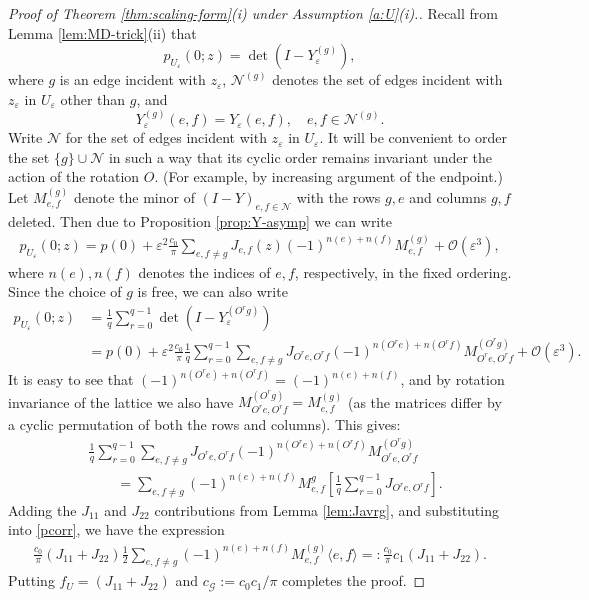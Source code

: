 \documentclass[11pt]{article}
\theoremstyle{remark}
\def\eps{\varepsilon}
\def\cG{\mathcal{G}}
\def\cN{\mathcal{N}}
\newcommand{\eqnspl}[2]{\begin{equation}\begin{split}\label{#1}%
   #2\end{split}\end{equation}}
\newcommand{\eqnsplst}[1]{\begin{equation*}\begin{split}%
   #1\end{split}\end{equation*}}
\begin{document}
\begin{proof}[Proof of Theorem \ref{thm:scaling-form}(i) under Assumption \ref{a:U}(i).]
Recall from Lemma \ref{lem:MD-trick}(ii) that
\[ p_{U_\eps}(0;z)
   = \det(I - Y^{(g)}_{\eps}), \]
where $g$ is an edge incident with $z_\eps$, $\cN^{(g)}$ denotes the set of edges incident with $z_\eps$
in $U_\eps$ other than $g$, and 
\[ Y^{(g)}_\eps(e,f)
   = Y_\eps(e,f), \quad e, f \in \cN^{(g)}. \]
Write $\cN$ for the set of edges incident with $z_\eps$ in $U_\eps$. It will be convenient
to order the set $\{ g \} \cup \mathcal{N}$ in such a way that its cyclic order remains
invariant under the action of the rotation $O$. (For example, by increasing argument of the
endpoint.) Let $M^{(g)}_{e,f}$ denote the minor of $(I - Y)_{e, f \in \cN}$ with 
the rows $g,e$ and columns $g,f$ deleted. Then due to Proposition \ref{prop:Y-asymp} we can write
\eqnsplst{
 p_{U_\eps}(0;z)
 = p(0) + \eps^2 \frac{c_0}{\pi} \sum_{e,f \not= g} 
   J_{e,f}(z) (-1)^{n(e)+n(f)} M^{(g)}_{e,f} + \mathcal{O}(\eps^3), }
where $n(e), n(f)$ denotes the indices of $e, f$, respectively, in the fixed ordering.
Since the choice of $g$ is free, we can also write
\begin{equation*}  
\begin{split}
 p_{U_\eps}(0;z)
 &= \frac{1}{q} \sum_{r=0}^{q-1} \det(I - Y^{(O^r g)}_{\eps}) \\
 &= p(0) + \eps^2 \frac{c_0}{\pi} \frac{1}{q} \sum_{r=0}^{q-1} \sum_{e,f \not= g} 
   J_{O^r e, O^r f} (-1)^{n(O^r e) + n(O^r f)} M^{(O^r g)}_{O^r e, O^r f}
   + \mathcal{O}(\eps^3). 
\end{split}
\end{equation*}
It is easy to see that $(-1)^{n(O^r e) + n(O^r f)} = (-1)^{n(e) + n(f)}$, and 
by rotation invariance of the lattice we also have 
$M^{(O^r g)}_{O^r e, O^r f} = M^{(g)}_{e,f}$ (as the matrices differ by a cyclic permutation 
of both the rows and columns). This gives:
\eqnspl{pcorr}
{ &\frac{1}{q} \sum_{r=0}^{q-1} \sum_{e,f \not= g} 
     J_{O^r e, O^r f} (-1)^{n(O^r e) + n(O^r f)} M^{(O^r g)}_{O^r e, O^r f} \\
  &\qquad = \sum_{e,f \not= g} (-1)^{n(e) + n(f)} M^g_{e,f} 
     \left[ \frac{1}{q} \sum_{r=0}^{q-1} J_{O^r e, O^r f} \right]. }
Adding the $J_{11}$ and $J_{22}$ contributions from Lemma \ref{lem:Javrg}, and substituting 
into \eqref{pcorr}, we have the expression
\eqnspl{e:c_0c_1}{
  \frac{c_0}{\pi} (J_{11} + J_{22}) \frac{1}{2} 
     \sum_{e,f \not= g} (-1)^{n(e)+n(f)} M^{(g)}_{e,f} \langle e,f \rangle
  =: \frac{c_0}{\pi} c_1 (J_{11} + J_{22}). } 
Putting $f_U = (J_{11} + J_{22})$ and $c_\cG := c_0 c_1 / \pi$ completes the proof.
\end{proof}
\end{document}
